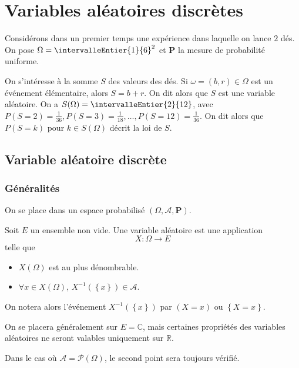 
\section{Variables aléatoires discrètes}

Considérons dans un premier temps une expérience dans laquelle on lance $2$ dés. On pose $\Omega = \intervalleEntier{1}{6}^2$ et $\mathbf{P}$ la mesure de probabilité uniforme.

On s’intéresse à la somme $S$ des valeurs des dés. Si $\omega = (b,r) \in \Omega$ est un événement élémentaire, alors $S = b + r$. On dit alors que $S$ est une variable aléatoire. On a $S(\Omega) = \intervalleEntier{2}{12}$, avec $P(S = 2) = \frac{1}{36}, P(S = 3) = \frac{1}{18}, \ldots, P(S = 12) = \frac{1}{36}$. On dit alors que $P(S = k)$ pour $k \in S(\Omega)$ décrit la loi de $S$.

\subsection{Variable aléatoire discrète}

    \subsubsection{Généralités}

    On se place dans un espace probabilisé $(\Omega, \mathcal{A}, \mathbf{P})$. 

    \begin{defi}{}{}
        Soit $E$ un ensemble non vide. Une variable aléatoire est une application 
        \[ X : \Omega \to E \]    
        telle que \begin{itemize}
            \item $X(\Omega)$ est au plus dénombrable.
            \item $\forall x \in X(\Omega)$, $X^{-1}(\left\{x\right\}) \in \mathcal{A}$.
        \end{itemize}
        On notera alors l’événement $X^{-1}(\left\{x\right\})$ par $(X = x)$ ou $\left\{X = x\right\}$.
    \end{defi}

    On se placera généralement sur $E = \mathbb{C}$, mais certaines propriétés des variables aléatoires ne seront valables uniquement sur $\mathbb{R}$.

    Dans le cas où $\mathcal{A} = \mathcal{P}(\Omega)$, le second point sera toujours vérifié. 

